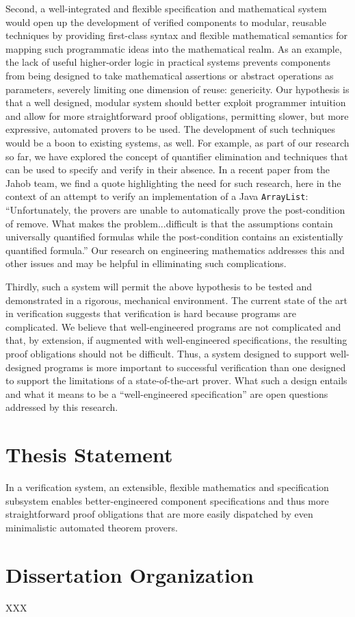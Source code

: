 Second, a well-integrated and flexible specification and mathematical system would open up the development of verified components to modular, reusable techniques by providing first-class syntax and flexible mathematical semantics for mapping such programmatic ideas into the mathematical realm.  As an example, the lack of useful higher-order logic in practical systems prevents components from being designed to take mathematical assertions or abstract operations as parameters, severely limiting one dimension of reuse: genericity\cite{bronishMap}.  Our hypothesis is that a well designed, modular system should better exploit programmer intuition and allow for more straightforward proof obligations, permitting slower, but more expressive, automated provers to be used.  The development of such techniques would be a boon to existing systems, as well.  For example, as part of our research so far, we have explored the concept of quantifier elimination and techniques that can be used to specify and verify in their absence.  In a recent paper from the Jahob team, we find a quote highlighting the need for such research, here in the context of an attempt to verify an implementation of a Java \texttt{ArrayList}: ``Unfortunately, the provers are unable to automatically prove the post-condition of remove.  What makes the problem...difficult is that the assumptions contain universally quantified formulas while the post-condition contains an existentially quantified formula.''  Our research on engineering mathematics addresses this and other issues and may be helpful in elliminating such complications.

Thirdly, such a system will permit the above hypothesis to be tested and demonstrated in a rigorous, mechanical environment.  The current state of the art in verification suggests that verification is hard because programs are complicated.  We believe that well-engineered programs are not complicated and that, by extension, if augmented with well-engineered specifications, the resulting proof obligations should not be difficult.  Thus, a system designed to support well-designed programs is more important to successful verification than one designed to support the limitations of a state-of-the-art prover.  What such a design entails and what it means to be a ``well-engineered specification'' are open questions addressed by this research.

\section{Thesis Statement}
In a verification system, an extensible, flexible mathematics and specification subsystem enables better-engineered component specifications and thus more straightforward proof obligations that are more easily dispatched by even minimalistic automated theorem provers.

\section{Dissertation Organization}
XXX
